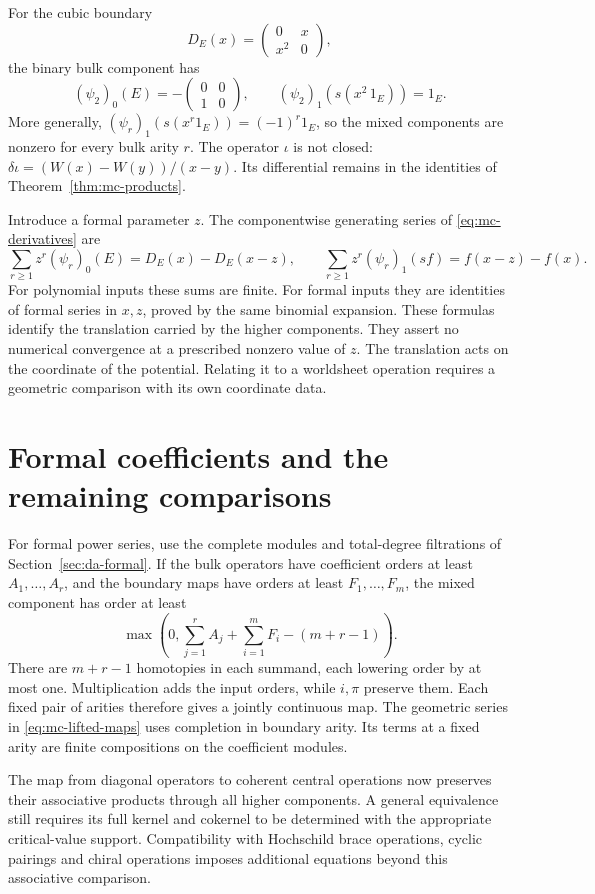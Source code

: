 For the cubic boundary
\[
 D_E(x)=\begin{pmatrix}0&x\\x^2&0\end{pmatrix},
\]
the binary bulk component has
\[
 (\psi_2)_0(E)=-\begin{pmatrix}0&0\\1&0\end{pmatrix},
 \qquad
 (\psi_2)_1(s(x^2\,1_E))=1_E.
\]
More generally,
\((\psi_r)_1(s(x^r1_E))=(-1)^r1_E\), so the mixed
components are nonzero for every bulk arity \(r\).
The operator \(\iota\) is not closed:
\(\delta\iota=(W(x)-W(y))/(x-y)\).
Its differential remains in the identities of
Theorem~\ref{thm:mc-products}.

Introduce a formal parameter \(z\). The componentwise
generating series of \eqref{eq:mc-derivatives} are
\[
 \sum_{r\geq1}z^r(\psi_r)_0(E)=D_E(x)-D_E(x-z),\qquad
 \sum_{r\geq1}z^r(\psi_r)_1(sf)=f(x-z)-f(x).
\]
For polynomial inputs these sums are finite. For formal
inputs they are identities of formal series in \(x,z\),
proved by the same binomial expansion. These formulas
identify the translation carried by the higher components.
They assert no numerical convergence at a prescribed
nonzero value of \(z\).
The translation acts on the coordinate of the potential.
Relating it to a worldsheet operation requires a geometric
comparison with its own coordinate data.

\section{Formal coefficients and the remaining comparisons}
\label{sec:mc-formal}

For formal power series, use the complete modules and
total-degree filtrations of Section~\ref{sec:da-formal}.
If the bulk operators have coefficient orders at least
\(A_1,\ldots,A_r\), and the boundary maps have orders at least
\(F_1,\ldots,F_m\), the mixed component has order at least
\[
 \max\left(0,\sum_{j=1}^r A_j+\sum_{i=1}^m F_i-(m+r-1)\right).
\]
There are \(m+r-1\) homotopies in each summand, each lowering
order by at most one. Multiplication adds the input orders,
while \(i,\pi\) preserve them. Each fixed pair of arities
therefore gives a jointly continuous map.
The geometric series in \eqref{eq:mc-lifted-maps} uses
completion in boundary arity. Its terms at a fixed arity
are finite compositions on the coefficient modules.

The map from diagonal operators to coherent central
operations now preserves their associative products through
all higher components. A general equivalence still requires
its full kernel and cokernel to be determined with the
appropriate critical-value support. Compatibility with
Hochschild brace operations, cyclic pairings and chiral
operations imposes additional equations beyond this
associative comparison.
